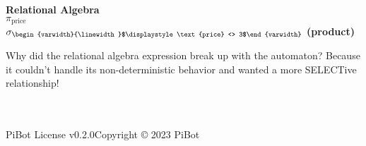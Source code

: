 \documentclass{article}
\date{}
\newcommand{\multiline}[1]{\begin{varwidth}{\linewidth}$\displaystyle #1$\end{varwidth}}
\begin{document}
\begin{landscape}
\pagestyle{fancy}
\fancyhf{}
\renewcommand{\headrulewidth}{0pt}
\begin{flushleft}
\doublespacing
{\fontsize{14}{12}\selectfont
\textbf{\huge{Relational Algebra}}\newline \\
$\pi_{\text{price}}$
\\
\hspace{0.5em}\fontsize{14}{12}\selectfont$\sigma_{\fontsize{10}{5}\multiline{\text{price} <> 3}}$
\textbf{(product)}
}
\end{flushleft}
\vfill
Why did the relational algebra expression break up with the automaton? Because it couldn't handle its non-deterministic behavior and wanted a more SELECTive relationship!
\\ \\ \\ 
\begin{center}
\parbox{\linewidth}{\raggedright PiBot License v0.2.0\hfill Copyright © 2023 PiBot}
\end{center}
\end{landscape}
\end{document}
